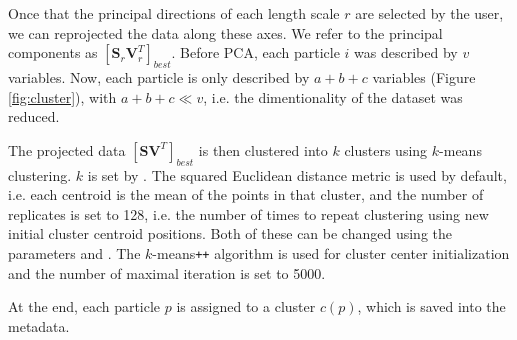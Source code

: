 Once that the principal directions of each length scale $r$ are selected by the user, we can reprojected the data along these axes. We refer to the principal components as ${[\bm{S}_{r}\bm{V}^{T}_r]}_{best}$. Before PCA, each particle $i$ was described by $v$ variables. Now, each particle is only described by $a+b+c$ variables (Figure \ref{fig:cluster}), with $a+b+c \ll v$, i.e. the dimentionality of the dataset was reduced.



The projected data ${[\bm{SV}^T]}_{best}$ is then clustered into $k$ clusters using $k$-means clustering. $k$ is set by . The squared Euclidean distance metric is used by default, i.e. each centroid is the mean of the points in that cluster, and the number of replicates is set to 128, i.e. the number of times to repeat clustering using new initial cluster centroid positions. Both of these can be changed using the parameters  and . The $k$-means\texttt{++} algorithm is used for cluster center initialization and the number of maximal iteration is set to 5000.

At the end, each particle $p$ is assigned to a cluster $c(p)$, which is saved into the metadata.









